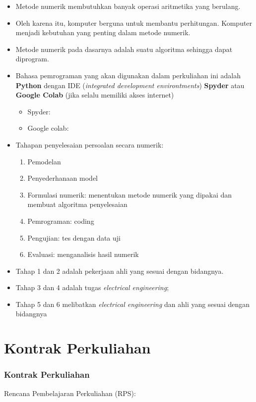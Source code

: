 \documentclass[pdflatex,compress,mathserif]{beamer}
\begin{document}
\begin{frame}
	\begin{itemize}
		\item Metode numerik membutuhkan banyak operasi aritmetika yang berulang.
		\item Oleh karena itu, komputer berguna untuk membantu perhitungan. Komputer menjadi kebutuhan yang penting dalam metode numerik.
		\item Metode numerik pada dasarnya adalah suatu algoritma sehingga dapat diprogram.
		\item Bahasa pemrograman yang akan digunakan dalam perkuliahan ini adalah \textbf{Python} dengan IDE (\textit{integrated development environtments}) \textbf{Spyder} atau \textbf{Google Colab} (jika selalu memiliki akses internet)
		\begin{itemize}
			\item Spyder: \href{https://github.com/spyder-ide/spyder/releases/latest/download/Spyder_64bit_full.exe}{}
			\item Google colab: \href{https://colab.research.google.com/}{}
		\end{itemize}
	\end{itemize}
\end{frame}

\begin{frame}
	\begin{itemize}
		\item Tahapan penyelesaian persoalan secara numerik:
		\begin{enumerate}
			\item Pemodelan
			\item Penyederhanaan model
			\item Formulasi numerik: menentukan metode numerik yang dipakai dan membuat algoritma penyelesaian
			\item Pemrograman: coding
			\item Pengujian: tes dengan data uji
			\item Evaluasi: menganalisis hasil numerik
		\end{enumerate}
		\item Tahap 1 dan 2 adalah pekerjaan ahli yang sesuai dengan bidangnya.
		\item Tahap 3 dan 4 adalah tugas \textit{electrical engineering};
		\item Tahap 5 dan 6 melibatkan \textit{electrical engineering} dan ahli yang sesuai dengan bidangnya
		
	\end{itemize}
\end{frame}

\section{Kontrak Perkuliahan}

\begin{frame}
	\frametitle{Kontrak Perkuliahan}
	Rencana Pembelajaran Perkuliahan (RPS): \href{../../../silabus/TE201406_Metode_Numerik_RPS_2023.pdf}{}
\end{frame}
\end{document}

